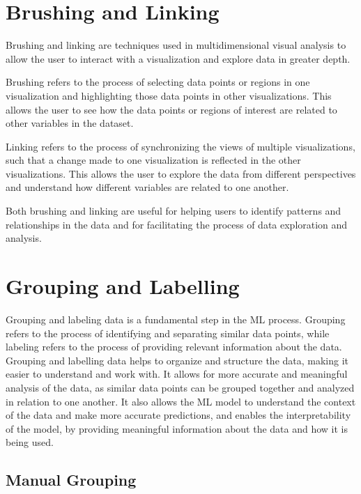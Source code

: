 \section{Brushing and Linking}

Brushing and linking are techniques used in multidimensional visual
analysis to allow the user to interact with a visualization and
explore data in greater depth.

Brushing refers to the process of selecting data points or regions in
one visualization and highlighting those data points in other
visualizations. This allows the user to see how the data points or
regions of interest are related to other variables in the dataset.

Linking refers to the process of synchronizing the views of multiple
visualizations, such that a change made to one visualization is
reflected in the other visualizations. This allows the user to explore
the data from different perspectives and understand how different
variables are related to one another.

Both brushing and linking are useful for helping users to identify
patterns and relationships in the data and for facilitating the
process of data exploration and analysis.






\section{Grouping and Labelling}

Grouping and labeling data is a fundamental step in the ML process.
Grouping refers to the process of identifying and separating similar data
points, while labeling refers to the process of providing relevant
information about the data. Grouping and labelling data helps to organize
and structure the data, making it easier to understand and work with. It
allows for more accurate and meaningful analysis of the data, as similar
data points can be grouped together and analyzed in relation to one
another. It also allows the ML model to understand the context of the data
and make more accurate predictions, and enables the interpretability of
the model, by providing meaningful information about the data and how it
is being used.

\subsection{Manual Grouping}

